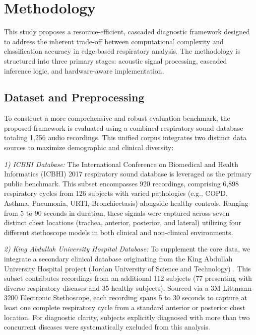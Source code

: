 \section{Methodology}
\label{sec:methodology}

This study proposes a resource-efficient, cascaded diagnostic framework designed to address the inherent trade-off between computational complexity and classification accuracy in edge-based respiratory analysis. The methodology is structured into three primary stages: acoustic signal processing, cascaded inference logic, and hardware-aware implementation.

\subsection{Dataset and Preprocessing}
To construct a more comprehensive and robust evaluation benchmark, the proposed framework is evaluated using a combined respiratory sound database totaling 1,256 audio recordings. This unified corpus integrates two distinct data sources to maximize demographic and clinical diversity:

\textit{1) ICBHI Database:} The International Conference on Biomedical and Health Informatics (ICBHI) 2017 respiratory sound database \cite{b16} is leveraged as the primary public benchmark. This subset encompasses 920 recordings, comprising 6,898 respiratory cycles from 126 subjects with varied pathologies (e.g., COPD, Asthma, Pneumonia, URTI, Bronchiectasis) alongside healthy controls. Ranging from 5 to 90 seconds in duration, these signals were captured across seven distinct chest locations (trachea, anterior, posterior, and lateral) utilizing four different stethoscope models in both clinical and non-clinical environments.

\textit{2) King Abdullah University Hospital Database:} To supplement the core data, we integrate a secondary clinical database originating from the King Abdullah University Hospital project (Jordan University of Science and Technology) \cite{kauh_db}. This subset contributes recordings from an additional 112 subjects (77 presenting with diverse respiratory diseases and 35 healthy subjects). Sourced via a 3M Littmann 3200 Electronic Stethoscope, each recording spans 5 to 30 seconds to capture at least one complete respiratory cycle from a standard anterior or posterior chest location. For diagnostic clarity, subjects explicitly diagnosed with more than two concurrent diseases were systematically excluded from this analysis.


